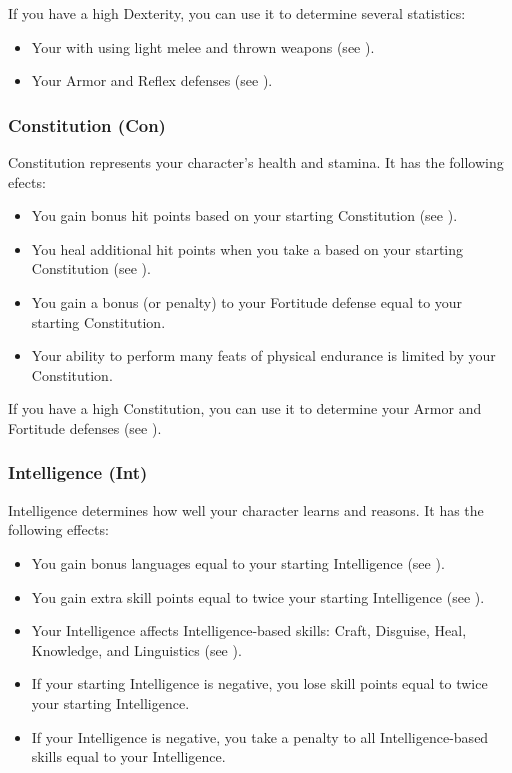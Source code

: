             If you have a high Dexterity, you can use it to determine several statistics:
            \begin{itemize}
                \item Your  with  using light melee and thrown weapons (see ).
                \item Your Armor and Reflex defenses (see ).
            \end{itemize}

        \subsubsection{Constitution (Con)}\label{Constitution}
            Constitution represents your character's health and stamina.
            It has the following efects:
            \begin{itemize}
                \item You gain bonus hit points based on your starting Constitution (see ).
                \item You heal additional hit points when you take a  based on your starting Constitution (see ).
                \item You gain a bonus (or penalty) to your Fortitude defense equal to your starting Constitution.
                \item Your ability to perform many feats of physical endurance is limited by your Constitution.
            \end{itemize}

            If you have a high Constitution, you can use it to determine your Armor and Fortitude defenses (see ).

        \subsubsection{Intelligence (Int)}\label{Intelligence}
            Intelligence determines how well your character learns and reasons.
            It has the following effects:

            \begin{itemize}
                \item You gain bonus languages equal to your starting Intelligence (see ).
                \item You gain extra skill points equal to twice your starting Intelligence (see ).
                \item Your Intelligence affects Intelligence-based skills: Craft, Disguise, Heal, Knowledge, and Linguistics (see ).
                \item If your starting Intelligence is negative, you lose skill points equal to twice your starting Intelligence.
                \item If your Intelligence is negative, you take a penalty to all Intelligence-based skills equal to your Intelligence.
            \end{itemize}

